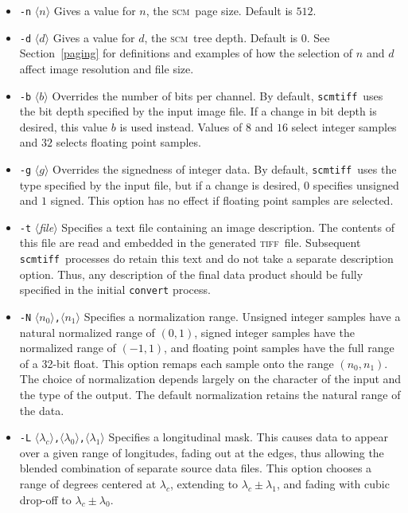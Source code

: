 \documentclass[oneside,11pt]{memoir}
\newcommand{\scm}     {\textsc{scm}}
\newcommand{\tiff}    {\textsc{tiff}}
\newcommand{\scmtiff} {\texttt{scmtiff}}
\newcommand{\inangles}[1]{$\langle$#1$\rangle$}
\newenvironment{optionlist}
  {\setlength{\leftmargini}{1in}\begin{itemize}}{\end{itemize}}
\begin{document}
\begin{Spacing}{1.1}
\begin{optionlist}
\item[\texttt{-n} \inangles{$n$}] Gives a value for $n$, the \scm\ page size. Default is $512$.

\item[\texttt{-d} \inangles{$d$}] Gives a value for $d$, the \scm\ tree depth. Default is $0$. See Section~\ref{paging} for definitions and examples of how the selection of $n$ and $d$ affect image resolution and file size.

\item[\texttt{-b} \inangles{$b$}] Overrides the number of bits per channel. By default, \scmtiff\ uses the bit depth specified by the input image file. If a change in bit depth is desired, this value $b$ is used instead. Values of $8$ and $16$ select integer samples and $32$ selects floating point samples.

\item[\texttt{-g} \inangles{$g$}] Overrides the signedness of integer data. By default, \scmtiff\ uses the type specified by the input file, but if a change is desired, $0$ specifies unsigned and $1$ signed. This option has no effect if floating point samples are selected.

\item[\texttt{-t} \inangles{\textit{file}}] Specifies a text file containing an image description. The contents of this file are read and embedded in the generated \tiff\ file. Subsequent \scmtiff\ processes do retain this text and do not take a separate description option. Thus, any description of the final data product should be fully specified in the initial \texttt{convert} process.

\item[\texttt{-N} \inangles{$n_0$}\texttt{,}\inangles{$n_1$}] Specifies a normalization range. Unsigned integer samples have a natural normalized range of $(0, 1)$, signed integer samples have the normalized range of $(-1,1)$, and floating point samples have the full range of a 32-bit float. This option remaps each sample onto the range $(n_0,n_1)$. The choice of normalization depends largely on the character of the input and the type of the output. The default normalization retains the natural range of the data.

\item[\texttt{-L} \inangles{$\lambda_c$}\texttt{,}\inangles{$\lambda_0$}\texttt{,}\inangles{$\lambda_1$}] Specifies a longitudinal mask. This causes data to appear over a given range of longitudes, fading out at the edges, thus allowing the blended combination of separate source data files. This option chooses a range of degrees centered at $\lambda_c$, extending to $\lambda_c\pm\lambda_1$, and fading with cubic drop-off to $\lambda_c\pm\lambda_0$.


\end{optionlist}
\end{Spacing}
\end{document}
